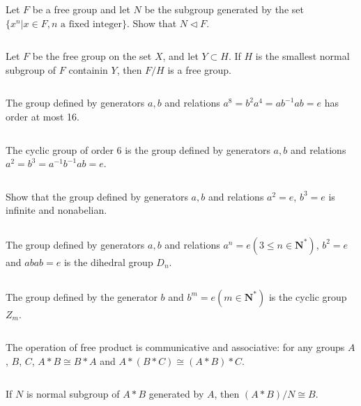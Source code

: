 $$ $$

\begin{ex}
    Let $F$ be a free group and let $N$ be the subgroup generated by the set $\{x^{n}|x\in F, n\text{ a fixed integer}\}$. Show that $N\lhd F$.
\end{ex}

$$ $$

\begin{ex}
    Let $F$ be the free group on the set $X$, and let $Y\subset H$. If $H$ is the smallest normal subgroup of $F$ containin $Y$, then $F /H$ is a free group.
\end{ex}

$$ $$

\begin{ex}
    The group defined by generators $a,b$ and relations $a^{8}=b^{2}a^{4}=ab^{-1}ab=e$ has order at most 16.
\end{ex}

$$ $$

\begin{ex}
    The cyclic group of order 6 is the group defined by generators $a, b$ and relations $a^{2}=b^{3}=a^{-1}b^{-1}ab=e$.
\end{ex}

$$ $$

\begin{ex}
    Show that the group defined by generators $a, b$ and relations $a^{2}=e$, $b^{3}=e$ is infinite and nonabelian.
\end{ex}

$$ $$

\begin{ex}
    The group defined by generators $a, b$ and relations $a^{n}=e (3\leq n\in \mathbf{N}^{*})$, $b^{2}=e$ and $abab=e$ is the dihedral group $D_{n}$.
\end{ex}

$$ $$

\begin{ex}
    The group defined by the generator $b$ and $b^{m}=e(m\in \mathbf{N}^{*})$ is the cyclic group $Z_{m}$.
\end{ex}

$$ $$

\begin{ex}
    The operation of free product is communicative and associative: for any groups $A$, $B$, $C$, $A*B\cong B*A$ and $A*(B*C)\cong (A*B)*C$.
\end{ex}

$$ $$

\begin{ex}
    If $N$ is normal subgroup of $A*B$ generated by $A$, then $(A*B) /N\cong B$.
\end{ex}

